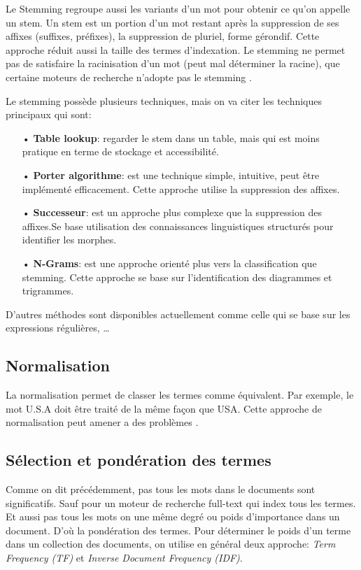 Le Stemming regroupe aussi les variants d'un mot pour obtenir ce qu'on appelle un stem. Un stem est un portion d'un mot restant après la suppression de ses affixes (suffixes, préfixes), la suppression de pluriel, forme gérondif. Cette approche réduit aussi la taille des termes d'indexation. Le stemming ne permet pas de satisfaire la racinisation d'un mot (peut mal déterminer la racine), que certaine moteurs de recherche n'adopte pas le stemming \citep*{modern-ir, vsm}.

Le stemming possède plusieurs techniques, mais on va citer les techniques principaux qui sont:

\begin{itemize}
    \item[•] \textbf{Table lookup}: regarder le stem dans un table, mais qui est moins pratique en terme de stockage et accessibilité.
    \item[•] \textbf{Porter algorithme}: est une technique simple, intuitive, peut être implémenté efficacement. Cette approche utilise la suppression des affixes.
    \item[•] \textbf{Successeur}: est un approche plus complexe que la suppression des affixes.Se base utilisation des connaissances linguistiques structurés pour identifier les morphes.
    \item[•] \textbf{N-Grams}: est une approche orienté plus vers la classification que stemming. Cette approche se base sur l'identification des diagrammes et trigrammes.
\end{itemize}

D'autres méthodes sont disponibles actuellement comme celle qui se base sur les expressions régulières, \dots

\subsection{Normalisation}
La normalisation permet de classer les termes comme équivalent. Par exemple, le mot U.S.A doit être traité de la même façon que USA. Cette approche de normalisation peut amener a des problèmes \citep{sarch-engine-vsm}.

\subsection{Sélection et pondération des termes}
Comme on dit précédemment, pas tous les mots dans le documents sont significatifs. Sauf pour un moteur de recherche full-text qui index tous les termes. Et aussi pas tous les mots on une même degré ou poids d'importance dans un document. D'où la pondération des termes. Pour déterminer le poids d'un terme dans un collection des documents, on utilise en général deux approche: \textit{Term Frequency (TF)} et \textit{Inverse Document Frequency (IDF)}.

